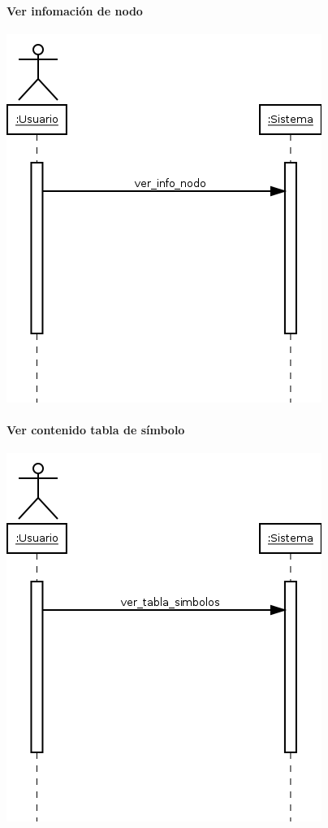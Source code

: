 \paragraph{Ver infomación de nodo}
\begin{center}
\includegraphics[scale=0.4]{ver_info_nodo.png} \\
\end{center}
\paragraph{Ver contenido tabla de símbolo}
\begin{center}
\includegraphics[scale=0.4]{ver_tabla_simbolos.png} \\
\end{center}
